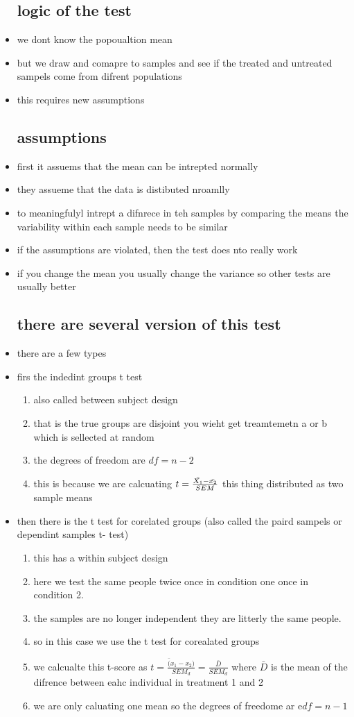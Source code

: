 \documentclass{article}
\begin{document}
\begin{itemize}
\subsection{logic of the test}
\item we dont know the popoualtion mean 
\item but we draw and comapre to samples and see if the treated and untreated sampels come from difrent populations 
\item this requires new assumptions 
\subsection{assumptions }
\item first it assuems that the mean can be intrepted normally
\item they assueme that the data is distibuted nroamlly
\item to meaningfulyl intrept a difnrece in teh samples by comparing the means the variability within each sample needs to be similar 
\item if the assumptions are violated, then the test does nto really work 
\item if you change the mean you usually change the variance so other tests are usually better
\subsection{there are several version of this test}
\item there are a few types 
\item firs the indedint groups t test
\begin{enumerate}
    \item also called between subject design 
    \item that is the true groups are disjoint you wieht get treamtemetn a or b which is sellected at random 
    \item  the degrees of freedom are $df=n-2$
    \item this is because we are calcuating $t=\frac{\Bar{X_1}-\Bar{x_2}}{SEM}$ this thing distributed as two sample means 
\end{enumerate}
\item then there is the t test for corelated groups (also called the paird sampels or dependint samples t- test) 
\begin{enumerate}
    \item this has a within subject design 
    \item here we test the same people twice once in condition one once in condition 2. 
    \item the samples are no longer independent they are litterly the same people. 
    \item so in this case we use the t test for corealated groups 
    \item we calcualte this t-score as $t=\frac{\bar(x_1-x_2)}{SEM_d}=\frac{\bar{D}}{SEM_d}$ where $\bar{D}$ is the mean of the difrence between eahc individual in treatment 1 and 2 
    \item we are only caluating one mean so the degrees of freedome ar e$df=n-1$
\end{enumerate}

\end{itemize}
\end{document}
